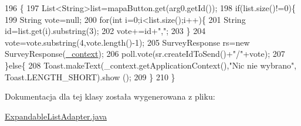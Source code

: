 \begin{DoxyCode}
196                                        \{
197             List<String>list=mapaButton.get(arg0.getId());
198             \textcolor{keywordflow}{if}(list.size()!=0)\{
199                 String vote=null;
200                 \textcolor{keywordflow}{for}(\textcolor{keywordtype}{int} i=0;i<list.size();i++)\{
201                     String \textcolor{keywordtype}{id}=list.get(i).substring(3);
202                     vote+=\textcolor{keywordtype}{id}+\textcolor{stringliteral}{","};           
203                 \}
204                 vote=vote.substring(4,vote.length()-1);
205             SurveyResponse rs=\textcolor{keyword}{new} SurveyResponse(\hyperlink{classcom_1_1example_1_1qrpoll_1_1_expandable_list_adapter_a7a712744eebf94bc189b44e5d04ff7da}{\_context});
206             poll.vote(sr.createIdToSend()+\textcolor{stringliteral}{"/"}+vote);
207             \}\textcolor{keywordflow}{else}\{
208                 Toast.makeText(\_context.getApplicationContext(),\textcolor{stringliteral}{"Nic nie wybrano"}, Toast.LENGTH\_SHORT).show
      ();
209             \}
210         \}
\end{DoxyCode}


Dokumentacja dla tej klasy została wygenerowana z pliku\+:\begin{DoxyCompactItemize}
\item 
\hyperlink{_expandable_list_adapter_8java}{Expandable\+List\+Adapter.\+java}\end{DoxyCompactItemize}
